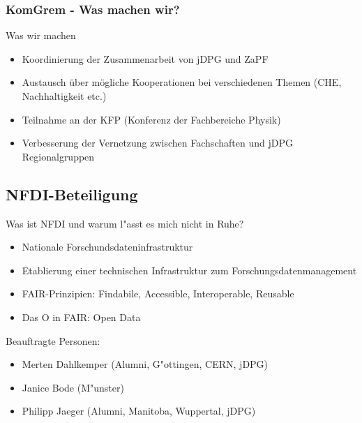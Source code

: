 \documentclass[compress, aspectratio=169]{beamer}
\begin{document}
\begin{frame}\frametitle{KomGrem - Was machen wir?}
	\begin{block}{Was wir machen}
		\begin{itemize}
			\item Koordinierung der Zusammenarbeit von jDPG und ZaPF
			\item Austausch über mögliche Kooperationen bei verschiedenen Themen (CHE, Nachhaltigkeit etc.)
			\item Teilnahme an der KFP (Konferenz der Fachbereiche Physik)
			\item Verbesserung der Vernetzung zwischen Fachschaften und jDPG Regionalgruppen
		\end{itemize}
	\end{block}
\end{frame}

\subsection{NFDI-Beteiligung}
\begin{frame}{\insertsubsection}
	\vspace{-3mm}
	\begin{block}{Was ist NFDI und warum l"asst es mich nicht in Ruhe?}
		\begin{itemize}
			\item Nationale Forschundsdateninfrastruktur
			\item Etablierung einer technischen Infrastruktur zum Forschungsdatenmanagement
			\item FAIR-Prinzipien: Findabile, Accessible, Interoperable, Reusable
			\item \glqq Das O in FAIR\grqq: Open Data
		\end{itemize}
	\end{block}
	\pause
	\vspace{4mm}
	\scriptsize
	Beauftragte Personen:
	\begin{itemize}
		\item Merten Dahlkemper (Alumni, G"ottingen, CERN, jDPG)
		\item Janice Bode (M"unster)
		\item Philipp Jaeger (Alumni, Manitoba, Wuppertal, jDPG)
	\end{itemize}
\end{frame}
\end{document}
